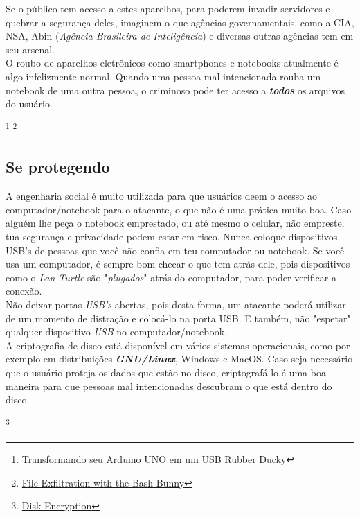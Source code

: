 \documentclass[12pt, letterpaper, DejaVuSansMono:12]{report}
\begin{document}
	Se o público tem acesso a estes aparelhos, para poderem invadir servidores e quebrar a segurança deles, imaginem o que agências governamentais, como a CIA, NSA, Abin (\textit{Agência Brasileira de Inteligência}) e diversas outras agências tem em seu arsenal.\\

	O roubo de aparelhos eletrônicos como smartphones e notebooks atualmente é algo infelizmente normal. Quando uma pessoa mal intencionada rouba um notebook de uma outra pessoa, o criminoso pode ter acesso a \textit{\textbf{todos}} os arquivos do usuário.

\footnote{\href{http://pythoneiro.blogspot.com.br/2015/04/transformando-seu-arduino-uno-em-um-usb.html?ref=@pr1v8}{Transformando seu Arduino UNO em um USB Rubber Ducky}}
\footnote{\href{http://brianlam.me/blog/file-exfiltration-with-the-bash-bunny}{File Exfiltration with the Bash Bunny}}
\pagebreak

	\subsection{Se protegendo}
		A engenharia social é muito utilizada para que usuários deem o acesso ao computador/notebook para o atacante, o que não é uma prática muito boa. Caso alguém lhe peça o notebook emprestado, ou até mesmo o celular, não empreste, tua segurança e privacidade podem estar em risco. Nunca coloque dispositivos USB's de pessoas que você não confia em teu computador ou notebook. Se você usa um computador, é sempre bom checar o que tem atrás dele, pois dispositivos como o \textit{Lan Turtle} são "\textit{plugados}" atrás do computador, para poder verificar a conexão.\\

	Não deixar portas \textit{USB's} abertas, pois desta forma, um atacante poderá utilizar de um momento de distração e colocá-lo na porta USB. E também, não "espetar" qualquer dispositivo \textit{USB} no computador/notebook.\\

	A criptografia de disco está disponível em vários sistemas operacionais, como por exemplo em distribuições \textit{\textbf{GNU/Linux}}, Windows e MacOS. Caso seja necessário que o usuário proteja os dados que estão no disco, criptografá-lo é uma boa maneira para que pessoas mal intencionadas descubram o que está dentro do disco.

\footnote{\href{https://wiki.archlinux.org/index.php/Disk_encryption}{Disk Encryption}}
\pagebreak
\end{document}
